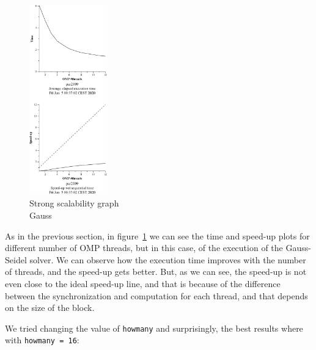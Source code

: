 
\begin{figure}[H]
    \centering
    \includegraphics[width=0.3\textwidth]{heat-omp-strong-gauss-crop}
    \caption{Strong scalability graph \\ Gauss}%
    \label{fig:strong-gauss}
\end{figure}

As in the previous section, in figure~\ref{fig:strong-gauss} we can see the time and speed-up plots for different number 
of OMP threads, but in this case, of the execution of the Gauss-Seidel solver. We can observe how the execution time improves with the number of threads, and the speed-up gets better. But, as we can see, the speed-up is not even close to the ideal speed-up line, and that is because of the difference between the synchronization and computation for each thread, and that depends on the size of the block.



We tried changing the value of \texttt{howmany} and surprisingly, the best results where with \texttt{howmany = 16}:

